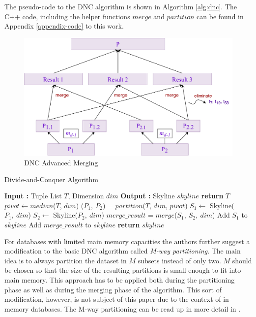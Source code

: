 The pseudo-code to the DNC algorithm is shown in Algorithm \ref{alg:dnc}. The C++ code, including the helper functions $merge$ and $partition$ can be found in Appendix \ref{appendix-code} to this work. 

\begin{figure}[h]
	\centering
	\includegraphics[width=0.9\linewidth]{figures/dnc-advanced-merge}
	\caption{DNC Advanced Merging}
	\label{fig:dnc-advanced-merge}
\end{figure}

\begin{algorithm}[h]
	\caption{Divide-and-Conquer Algorithm} \label{alg:dnc}
	\begin{algorithmic}[1] 
		\State \textbf{Input :} Tuple List $T$, Dimension $dim$
		\State \textbf{Output :} Skyline $skyline$
		 \textbf{return} $T$
		\EndIf
		\State $pivot \gets median$($T$, $dim$)
		\State ($P_{1},~P_{2}$) = $partition$($T$, $dim$, $pivot$)
		\State $S_{1} \gets$ Skyline($P_{1},~dim$)
		\State $S_{2} \gets$ Skyline($P_{2},~dim$)
		\State $merge\_result$ = $merge$($S_{1},~S_{2},~dim$)
		\State Add $S_{1}$ to $skyline$
		\State Add $merge\_result$ to $skyline$
		\State \textbf{return} $skyline$
	\end{algorithmic}
\end{algorithm}

For databases with limited main memory capacities the authors further suggest a modification to the basic DNC algorithm called \textit{M-way partitioning}. The main idea is to always partition the dataset in $M$ subsets instead of only two. $M$ should be chosen so that the size of the resulting partitions is small enough to fit into main memory. This approach has to be applied both during the partitioning phase as well as during the merging phase of the algorithm. This sort of modification, however, is not subject of this paper due to the context of in-memory databases. The M-way partitioning can be read up in more detail in \cite{kossmann}. 

